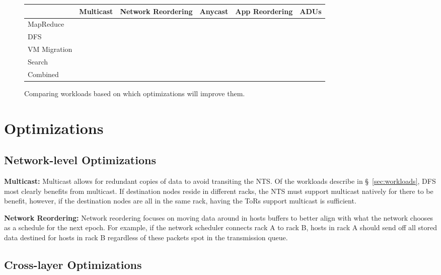 \begin{figure*}[t]
  \centering
  \begin{tabular}{| l | c | c | c | c | c |}
    \toprule
    & Multicast & Network Reordering & Anycast & App Reordering & ADUs\\
    \midrule
    MapReduce & & & & &\\
    DFS & & & & &\\
    VM Migration & & & & &\\
    Search & & & & &\\
    Combined & & & & &\\
    \bottomrule
  \end{tabular}
  \caption{Comparing workloads based on which optimizations will improve them.}
  \label{tab:optimizations-to-workloads}
\end{figure*}

\newpage\phantom{t}
\section{Optimizations}
\label{sec:optimizations}



\subsection{Network-level Optimizations}
\label{sec:net_opts}


{\bf Multicast:} Multicast allows for redundant copies of data to avoid
transiting the NTS. Of the workloads describe in \S~\ref{sec:workloads}, DFS
most clearly benefits from multicast. If destination nodes reside in different
racks, the NTS must support multicast natively for there to be benefit, however,
if the destination nodes are all in the same rack, having the ToRs support
multicast is sufficient. 

{\bf Network Reordering:} Network reordering focuses on moving data around in
hosts buffers to better align with what the network chooses as a schedule for
the next epoch. For example, if the network scheduler connects rack A to rack B,
hosts in rack A should send off all stored data destined for hosts in rack B
regardless of these packets spot in the transmission queue. 

\newpage\phantom{t}
\subsection{Cross-layer Optimizations}
\label{sec:cross_opts}

